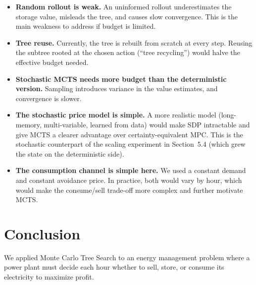 \documentclass[12pt,a4paper]{article}
\begin{document}
\begin{itemize}
  \item \textbf{Random rollout is weak.} An uninformed rollout underestimates
    the storage value, misleads the tree, and causes slow convergence.
    This is the main weakness to address if budget is limited.
  \item \textbf{Tree reuse.} Currently, the tree is rebuilt from scratch at
    every step. Reusing the subtree rooted at the chosen action (``tree
    recycling'') would halve the effective budget needed.
  \item \textbf{Stochastic MCTS needs more budget than the deterministic
    version.} Sampling introduces variance in the value estimates, and
    convergence is slower.
  \item \textbf{The stochastic price model is simple.} A more realistic model
    (long-memory, multi-variable, learned from data) would make SDP
    intractable and give MCTS a clearer advantage over certainty-equivalent
    MPC. This is the stochastic counterpart of the scaling experiment in
    Section~5.4 (which grew the state on the deterministic side).
  \item \textbf{The consumption channel is simple here.} We used a constant
    demand and constant avoidance price. In practice, both would vary by hour,
    which would make the consume/sell trade-off more complex and further
    motivate MCTS.
\end{itemize}

\section{Conclusion}

We applied Monte Carlo Tree Search to an energy management problem where a
power plant must decide each hour whether to sell, store, or consume its
electricity to maximize profit.
\end{document}
